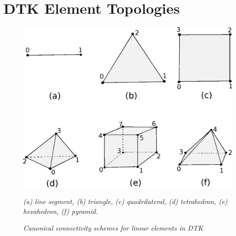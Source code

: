 \documentclass[letterpaper,12pt]{article}
\begin{document}
\clearpage




\clearpage

\appendix
\section{DTK Element Topologies}\label{apdx:cell_topo}

\begin{figure}[htpb!]
  \centering
  \includegraphics[width=5.5in]{Linear_Elements.eps}
  \caption{\sl Canonical connectivity schemes for linear elements in
    DTK}{\sl (a) line segment, (b) triangle, (c) quadrilateral, (d)
    tetrahedron, (e) hexahedron, (f) pyramid.}
  \label{fig:linear_elements}
\end{figure}

\clearpage

\end{document}
